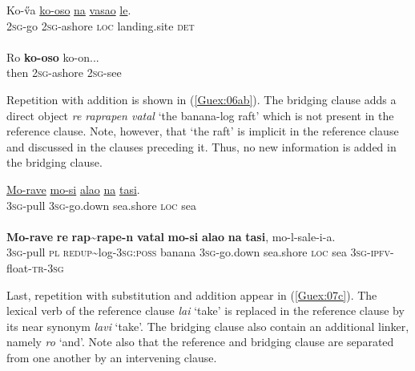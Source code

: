 \documentclass[output=paper]{LSP/langsci}
\begin{document}
\begin{exe}
\ex \label{Guex:05ab}
\begin{xlist}
\ex \label{Guex:05a}
\gll Ko-\H{v}a    \underline{ko-oso}         \underline{na}     \underline{vasao}          \underline{le}.\\
\textsc{2sg}-go   \textsc{2sg}-ashore   \textsc{loc}    landing.site   \textsc{det}\\
\glt {}\\
\ex \label{Guex:05b}
\gll Ro \textbf{ko-oso}        ko-on...\\     	       
    then   \textsc{2sg}-ashore   \textsc{2sg}-see \\
\glt {} 
\end{xlist}
\end{exe}


Repetition with addition is shown in (\ref{Guex:06ab}). The bridging clause adds a direct object \textit{re raprapen vatal} `the banana-log raft' which is not present in the reference clause. Note, however, that `the raft' is implicit in the reference clause and discussed in the clauses preceding it. Thus, no new information is added in the bridging clause.

\begin{exe}
\ex \label{Guex:06ab}
\begin{xlist}
\ex \label{Guex:06a}
\gll \underline{Mo-rave}   \underline{mo-si}    \underline{alao}    \underline{na}  \underline{tasi}.\\
\textsc{3sg}-pull    \textsc{3sg}-go.down  sea.shore  \textsc{loc}  sea\\
\glt {}\\
\ex \label{Guex:06b}
\gll \textbf{Mo-rave}  \textbf{re}  \textbf{rap{\textasciitilde}rape-n}    \textbf{vatal}        \textbf{mo-si} \textbf{alao}    \textbf{na}  \textbf{tasi}, mo-l-sale-i-a.\\     	       
\textsc{3sg}-pull  \textsc{pl}  \textsc{redup}{\textasciitilde}log-\textsc{3sg:poss} banana  \textsc{3sg}-go.down  sea.shore \textsc{loc} sea  \textsc{3sg-ipfv}-float-\textsc{tr-3sg} \\
\glt {} 
\end{xlist}
\end{exe}

Last, repetition with substitution and addition appear in (\ref{Guex:07c}). The lexical verb of the reference clause \textit{lai} `take' is replaced in the reference clause by its near synonym \textit{lavi} `take'. The bridging clause also contain an additional linker, namely \textit{ro} `and'.  Note also that the reference and bridging clause are separated from one another by an intervening clause.
\end{document}
